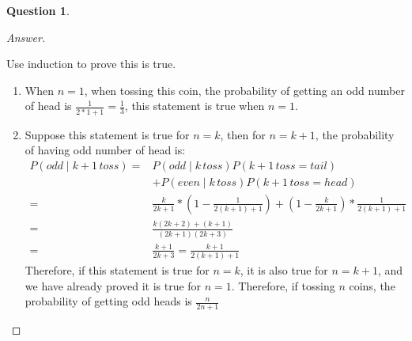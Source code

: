 \documentclass{article}
\theoremstyle{plain}
\newtheorem{question}{Question}
\newenvironment{answer}[1][Answer]
    {\begin{proof}[#1]{$ $}\renewcommand\qedsymbol{$\vartriangle$}}
    {\end{proof}}
\begin{document}
\begin{question}
\end{question}
\begin{answer}
    \begin{enumerate}
        Use induction to prove this is true.
        \begin{enumerate}
            \item When $n=1$, when tossing this coin, the probability of getting an odd number of head is $\displaystyle\frac{1}{2*1 + 1} = \frac{1}{3}$, this statement is true when $n = 1$.
            \item Suppose this statement is true for $n = k$, then for $n = k + 1$, the probability of having odd number of head is:
            \begin{equation*}
                \begin{aligned}
                    P(odd \mid k + 1\,toss) =& P(odd \mid k\,toss)P(k + 1\, toss = tail) \\
                    &+ P(even \mid k\,toss)P(k + 1\, toss = head) \\
                    =& \frac{k}{2k + 1} * (1 - \frac{1}{2(k + 1) + 1}) + (1 - \frac{k}{2k + 1}) * \frac{1}{2(k + 1) + 1} \\
                    =& \frac{k(2k + 2) + (k + 1)}{(2k + 1)(2k + 3)} \\
                    =& \frac{k + 1}{2k + 3} = \frac{k + 1}{2(k + 1) + 1}
                \end{aligned}
            \end{equation*}
        Therefore, if this statement is true for $n = k$, it is also true for $n = k + 1$, and we have already proved it is true for $n = 1$. Therefore, if tossing $n$ coins, the probability of getting odd heads is $\displaystyle\frac{n}{2n + 1}$
        \end{enumerate}
    \end{enumerate}
\end{answer}
\end{document}
